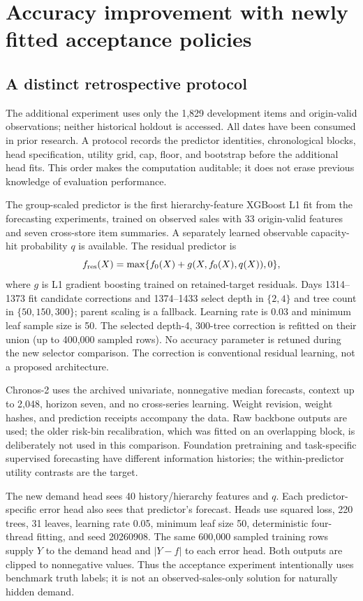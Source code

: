 \section{Accuracy improvement with newly fitted acceptance policies}
\label{app:accuracy}
\subsection{A distinct retrospective protocol}
The additional experiment uses only the 1,829 development items and origin-valid observations; neither historical holdout is accessed. All dates have been consumed in prior research. A protocol records the predictor identities, chronological blocks, head specification, utility grid, cap, floor, and bootstrap before the additional head fits. This order makes the computation auditable; it does not erase previous knowledge of evaluation performance.

The group-scaled predictor is the first hierarchy-feature XGBoost L1 fit from the forecasting experiments, trained on observed sales with 33 origin-valid features and seven cross-store item summaries. A separately learned observable capacity-hit probability $q$ is available. The residual predictor is
\[
 f_{\rm res}(X)=\max\{f_0(X)+g(X,f_0(X),q(X)),0\},
\]
where $g$ is L1 gradient boosting trained on retained-target residuals. Days 1314--1373 fit candidate corrections and 1374--1433 select depth in $\{2,4\}$ and tree count in $\{50,150,300\}$; parent scaling is a fallback. Learning rate is 0.03 and minimum leaf sample size is 50. The selected depth-4, 300-tree correction is refitted on their union (up to 400,000 sampled rows). No accuracy parameter is retuned during the new selector comparison. The correction is conventional residual learning, not a proposed architecture.

Chronos-2 uses the archived univariate, nonnegative median forecasts, context up to 2,048, horizon seven, and no cross-series learning. Weight revision, weight hashes, and prediction receipts accompany the data. Raw backbone outputs are used; the older risk-bin recalibration, which was fitted on an overlapping block, is deliberately not used in this comparison. Foundation pretraining and task-specific supervised forecasting have different information histories; the within-predictor utility contrasts are the target.

The new demand head sees 40 history/hierarchy features and $q$. Each predictor-specific error head also sees that predictor's forecast. Heads use squared loss, 220 trees, 31 leaves, learning rate 0.05, minimum leaf size 50, deterministic four-thread fitting, and seed 20260908. The same 600,000 sampled training rows supply $Y$ to the demand head and $|Y-f|$ to each error head. Both outputs are clipped to nonnegative values. Thus the acceptance experiment intentionally uses benchmark truth labels; it is not an observed-sales-only solution for naturally hidden demand.

